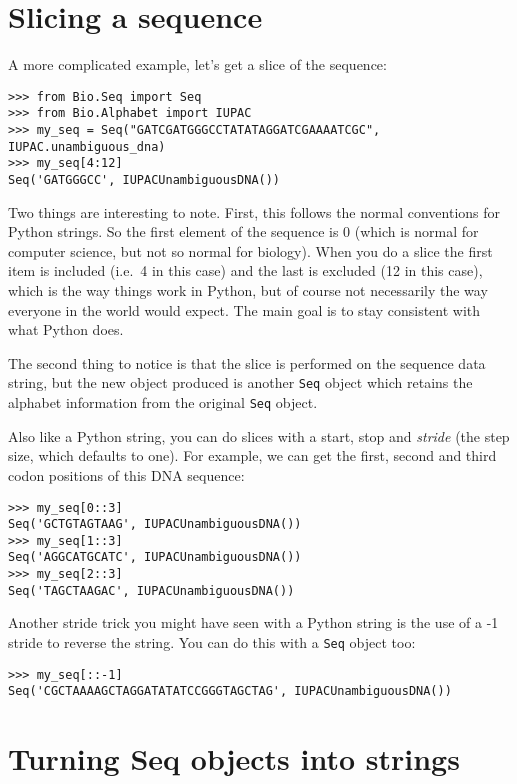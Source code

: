 \documentclass{report}
\begin{document}
\section{Slicing a sequence}

A more complicated example, let's get a slice of the sequence:

\begin{verbatim}
>>> from Bio.Seq import Seq
>>> from Bio.Alphabet import IUPAC
>>> my_seq = Seq("GATCGATGGGCCTATATAGGATCGAAAATCGC", IUPAC.unambiguous_dna)
>>> my_seq[4:12]
Seq('GATGGGCC', IUPACUnambiguousDNA())
\end{verbatim}

Two things are interesting to note. First, this follows the normal conventions for Python strings.  So the first element of the sequence is 0 (which is normal for computer science, but not so normal for biology). When you do a slice the first item is included (i.e.~4 in this case) and the last is excluded (12 in this case), which is the way things work in Python, but of course not necessarily the way everyone in the world would expect. The main goal is to stay consistent with what Python does.

The second thing to notice is that the slice is performed on the sequence data string, but the new object produced is another \verb|Seq| object which retains the alphabet information from the original \verb|Seq| object.

Also like a Python string, you can do slices with a start, stop and \emph{stride} (the step size, which defaults to one).  For example, we can get the first, second and third codon positions of this DNA sequence:

\begin{verbatim}
>>> my_seq[0::3]
Seq('GCTGTAGTAAG', IUPACUnambiguousDNA())
>>> my_seq[1::3]
Seq('AGGCATGCATC', IUPACUnambiguousDNA())
>>> my_seq[2::3]
Seq('TAGCTAAGAC', IUPACUnambiguousDNA())
\end{verbatim}

Another stride trick you might have seen with a Python string is the use of a -1 stride to reverse the string.  You can do this with a \verb|Seq| object too:

\begin{verbatim}
>>> my_seq[::-1]
Seq('CGCTAAAAGCTAGGATATATCCGGGTAGCTAG', IUPACUnambiguousDNA())
\end{verbatim}

\section{Turning Seq objects into strings}
\label{sec:seq-to-string}
\end{document}
